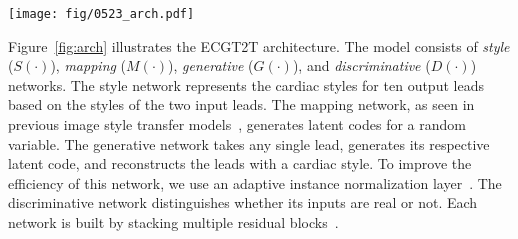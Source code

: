 \begin{figure*}[h]
\centering
\texttt{[image: fig/0523\_arch.pdf]}
\caption{ECGT2T model architecture. The model is comprised of style, mapping, generative, and discriminative networks. Each network is built with residual blocks. $L_{adv}$ is the adversarial objective, $L_{rec}$ is the reconstruction objective, $L_{con}$ is the lead consistency objective, and $L_{sty}$ is the style consistency objective.}
\label{fig:arch}
\end{figure*}

Figure~\ref{fig:arch} illustrates the ECGT2T architecture. The model consists of \textit{style} ($S(\cdot)$), \textit{mapping} ($M(\cdot)$), \textit{generative} ($G(\cdot)$), and \textit{discriminative} ($D(\cdot)$) networks. The style network represents the cardiac styles for ten output leads based on the styles of the two input leads. The mapping network, as seen in previous image style transfer models~\cite{kar2019}, generates latent codes for a random variable. The generative network takes any single lead, generates its respective latent code, and reconstructs the leads with a cardiac style. To improve the efficiency of this network, we use an adaptive instance normalization layer~\cite{hua17}. The discriminative network distinguishes whether its inputs are real or not. Each network is built by stacking multiple residual blocks~\cite{he16}.






